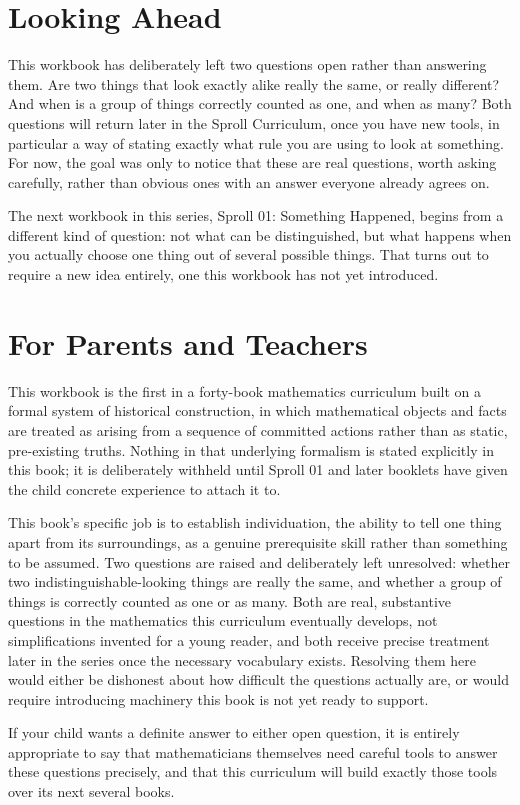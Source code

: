 \documentclass[11pt]{book}
\begin{document}
\chapter*{Looking Ahead}

This workbook has deliberately left two questions open rather than answering them. Are two things that look exactly alike really the same, or really different? And when is a group of things correctly counted as one, and when as many? Both questions will return later in the Sproll Curriculum, once you have new tools, in particular a way of stating exactly what rule you are using to look at something. For now, the goal was only to notice that these are real questions, worth asking carefully, rather than obvious ones with an answer everyone already agrees on.

The next workbook in this series, Sproll 01: Something Happened, begins from a different kind of question: not what can be distinguished, but what happens when you actually choose one thing out of several possible things. That turns out to require a new idea entirely, one this workbook has not yet introduced.

\chapter*{For Parents and Teachers}

This workbook is the first in a forty-book mathematics curriculum built on a formal system of historical construction, in which mathematical objects and facts are treated as arising from a sequence of committed actions rather than as static, pre-existing truths. Nothing in that underlying formalism is stated explicitly in this book; it is deliberately withheld until Sproll 01 and later booklets have given the child concrete experience to attach it to.

This book's specific job is to establish individuation, the ability to tell one thing apart from its surroundings, as a genuine prerequisite skill rather than something to be assumed. Two questions are raised and deliberately left unresolved: whether two indistinguishable-looking things are really the same, and whether a group of things is correctly counted as one or as many. Both are real, substantive questions in the mathematics this curriculum eventually develops, not simplifications invented for a young reader, and both receive precise treatment later in the series once the necessary vocabulary exists. Resolving them here would either be dishonest about how difficult the questions actually are, or would require introducing machinery this book is not yet ready to support.

If your child wants a definite answer to either open question, it is entirely appropriate to say that mathematicians themselves need careful tools to answer these questions precisely, and that this curriculum will build exactly those tools over its next several books.
\end{document}
